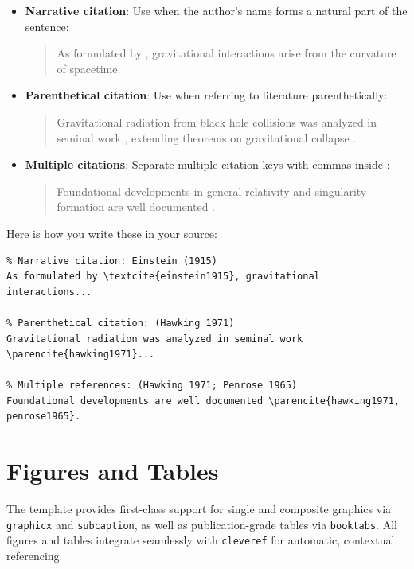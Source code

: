 \begin{itemize}
    \item \textbf{Narrative citation}: Use \texttt{\textcite{key}} when the author's name forms a natural part of the sentence:
          \begin{quote}
              As formulated by \textcite{einstein1915}, gravitational interactions arise from the curvature of spacetime.
          \end{quote}
    \item \textbf{Parenthetical citation}: Use \texttt{\parencite{key}} when referring to literature parenthetically:
          \begin{quote}
              Gravitational radiation from black hole collisions was analyzed in seminal work \parencite{hawking1971}, extending theorems on gravitational collapse \parencite{penrose1965}.
          \end{quote}
    \item \textbf{Multiple citations}: Separate multiple citation keys with commas inside \texttt{\parencite{...}}:
          \begin{quote}
              Foundational developments in general relativity and singularity formation are well documented \parencite{hawking1971,penrose1965,einstein1915}.
          \end{quote}
\end{itemize}

Here is how you write these in your source:
\begin{verbatim}
% Narrative citation: Einstein (1915)
As formulated by \textcite{einstein1915}, gravitational interactions...

% Parenthetical citation: (Hawking 1971)
Gravitational radiation was analyzed in seminal work \parencite{hawking1971}...

% Multiple references: (Hawking 1971; Penrose 1965)
Foundational developments are well documented \parencite{hawking1971, penrose1965}.
\end{verbatim}

\section{Figures and Tables}
\label{sec:figures_tables}
The template provides first-class support for single and composite graphics via \texttt{graphicx} and \texttt{subcaption}, as well as publication-grade tables via \texttt{booktabs}. All figures and tables integrate seamlessly with \texttt{cleveref} for automatic, contextual referencing.

